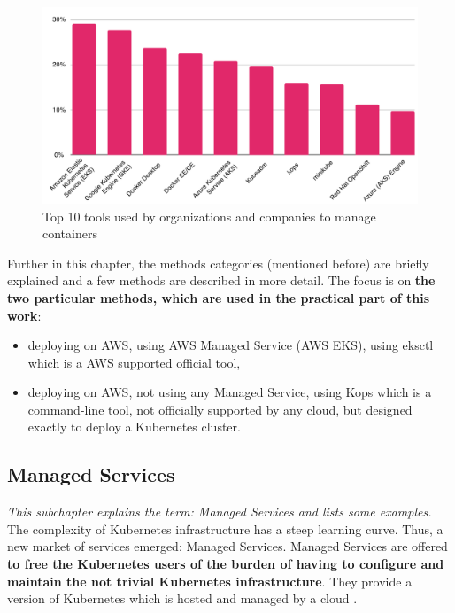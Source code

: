 \begin{figure}[H]
    \centering
    \includegraphics[width=16cm]{figures/cncf-2019-cont-tools.png}
    \captionsetup{justification=centering,margin=2cm}
    \caption{Top 10 tools used by organizations and companies to manage containers \cite{cncf-2019}}
\end{figure}

Further in this chapter, the methods categories (mentioned before) are briefly explained and a few methods are described in more detail. The focus is on \textbf{the two particular methods, which are used in the practical part of this work}:
\begin{itemize}
\item deploying on AWS, using AWS Managed Service (AWS EKS), using eksctl which is a AWS supported official tool,
\item deploying on AWS, not using any Managed Service, using Kops which is a command-line tool, not officially supported by any cloud, but designed exactly to deploy a Kubernetes cluster.
\end{itemize}

\subsection{Managed Services}
\textit{This subchapter explains the term: Managed Services and lists some examples.}
\\

The complexity of Kubernetes infrastructure has a steep learning curve. Thus, a new market of services emerged: Managed Services. Managed Services are offered \textbf{to free the Kubernetes users of the burden of having to configure and maintain the not trivial Kubernetes infrastructure}. They provide a version of Kubernetes which is hosted and managed by a cloud \cite{article-managed}.


